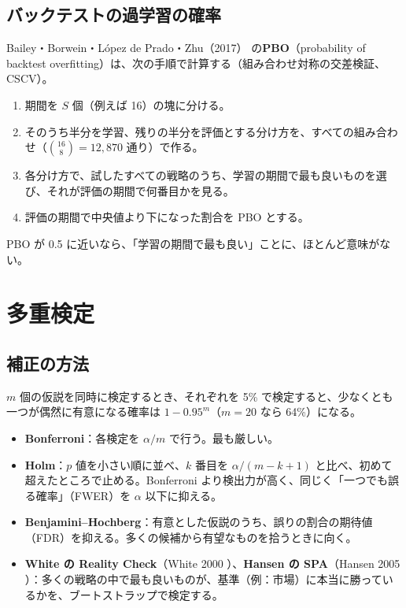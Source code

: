 \subsection{バックテストの過学習の確率}

Bailey・Borwein・López de Prado・Zhu（2017）\cite{pbo2017} の\textbf{PBO}（probability of backtest overfitting）は、次の手順で計算する（組み合わせ対称の交差検証、CSCV）。

\begin{enumerate}
\item 期間を $S$ 個（例えば 16）の塊に分ける。
\item そのうち半分を学習、残りの半分を評価とする分け方を、すべての組み合わせ（$\binom{16}{8} = 12{,}870$ 通り）で作る。
\item 各分け方で、試したすべての戦略のうち、学習の期間で最も良いものを選び、それが評価の期間で何番目かを見る。
\item 評価の期間で中央値より下になった割合を PBO とする。
\end{enumerate}
PBO が 0.5 に近いなら、「学習の期間で最も良い」ことに、ほとんど意味がない。

\section{多重検定}
\label{sec:mt}

\subsection{補正の方法}

$m$ 個の仮説を同時に検定するとき、それぞれを 5\% で検定すると、少なくとも一つが偶然に有意になる確率は $1 - 0.95^m$（$m = 20$ なら 64\%）になる。

\begin{itemize}
\item \textbf{Bonferroni}：各検定を $\alpha/m$ で行う。最も厳しい。
\item \textbf{Holm}\cite{holm1979}：$p$ 値を小さい順に並べ、$k$ 番目を $\alpha/(m-k+1)$ と比べ、初めて超えたところで止める。Bonferroni より検出力が高く、同じく「一つでも誤る確率」（FWER）を $\alpha$ 以下に抑える。
\item \textbf{Benjamini--Hochberg}\cite{bh1995}：有意とした仮説のうち、誤りの割合の期待値（FDR）を抑える。多くの候補から有望なものを拾うときに向く。
\item \textbf{White の Reality Check}（White 2000 \cite{white2000}）、\textbf{Hansen の SPA}（Hansen 2005 \cite{hansen2005}）：多くの戦略の中で最も良いものが、基準（例：市場）に本当に勝っているかを、ブートストラップで検定する。
\end{itemize}

